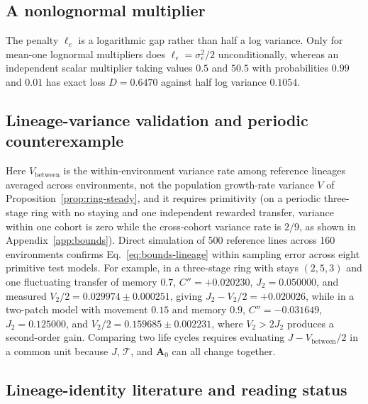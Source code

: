 \subsection{A nonlognormal multiplier}\label{esm:bounds-nonlognormal}

The penalty $\ell_e$ is a logarithmic gap rather than half a log variance. Only for mean-one lognormal multipliers does $\ell_e = \sigma_e^2/2$ unconditionally, whereas an independent scalar multiplier taking values $0.5$ and $50.5$ with probabilities $0.99$ and $0.01$ has exact loss $D = 0.6470$ against half log variance $0.1054$.

\subsection{Lineage-variance validation and periodic counterexample}\label{esm:bounds-lineage-check}

Here $V_{\mathrm{between}}$ is the within-environment variance rate among reference lineages averaged across environments, not the population growth-rate variance $V$ of Proposition~\ref{prop:ring-steady}, and it requires primitivity (on a periodic three-stage ring with no staying and one independent rewarded transfer, variance within one cohort is zero while the cross-cohort variance rate is $2/9$, as shown in Appendix~\ref{app:bounds}). Direct simulation of 500 reference lines across 160 environments confirms Eq.~\eqref{eq:bounds-lineage} within sampling error across eight primitive test models. For example, in a three-stage ring with stays $(2, 5, 3)$ and one fluctuating transfer of memory $0.7$, $C'' = +0.020230$, $J_2 = 0.050000$, and measured $V_2/2 = 0.029974 \pm 0.000251$, giving $J_2 - V_2/2 = +0.020026$, while in a two-patch model with movement $0.15$ and memory $0.9$, $C'' = -0.031649$, $J_2 = 0.125000$, and $V_2/2 = 0.159685 \pm 0.002231$, where $V_2 > 2J_2$ produces a second-order gain. Comparing two life cycles requires evaluating $J - V_{\mathrm{between}}/2$ in a common unit because $J$, $\mathcal{T}$, and $\mathbf{A}_0$ can all change together.

\subsection{Lineage-identity literature and reading status}\label{esm:bounds-literature-record}

